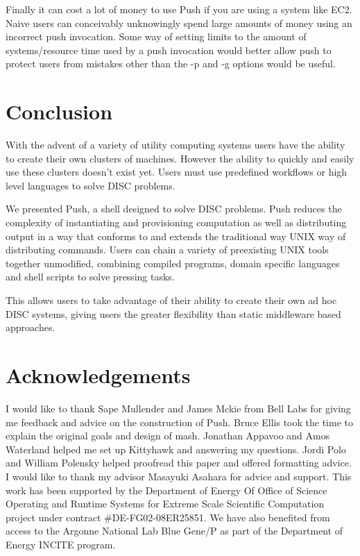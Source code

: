 \documentclass[11pt, letterpaper]{article}
\begin{document}
Finally it can cost a lot of money to use Push if you are using a system like EC2. Naive users can conceivably unknowingly spend large amounts of money using an incorrect push invocation. Some way of setting limits to the amount of systems/resource time used by a push invocation would better allow push to protect users from mistakes other than the -p and -g options would be useful. 
\section{Conclusion}

With the advent of a variety of utility computing systems users have the ability to create their own clusters of machines. However the ability to quickly and easily use these clusters doesn't exist yet. Users must use predefined workflows or high level languages to solve DISC problems.

We presented Push, a shell designed to solve DISC problems. Push reduces the complexity of instantiating and provisioning computation as well as distributing output in a way that conforms to and extends the traditional way UNIX way of distributing commands. Users can chain a variety of preexisting UNIX tools together unmodified, combining compiled programs, domain specific languages and shell scripts to solve pressing tasks.

This allows users to take advantage of their ability to create their own ad hoc DISC systems, giving users the greater flexibility than static middleware based approaches. 

\section{Acknowledgements}
 
I would like to thank Sape Mullender and James Mckie from Bell Labs for giving me feedback and advice on the construction of Push. Bruce Ellis took the time to explain the original goals and design of mash. Jonathan Appavoo and Amos Waterland helped me set up Kittyhawk and answering my questions.  Jordi Polo and William Polensky helped proofread this paper and offered formatting advice. I would like to thank my advisor Masayuki Asahara for advice and support. This work has been supported by the Department of Energy Of Office of Science Operating and Runtime Systems for Extreme Scale Scientific Computation project under contract \#DE-FG02-08ER25851. We have also benefited from access to the Argonne National Lab Blue Gene/P as part of the Department of Energy INCITE program.






\end{document}
